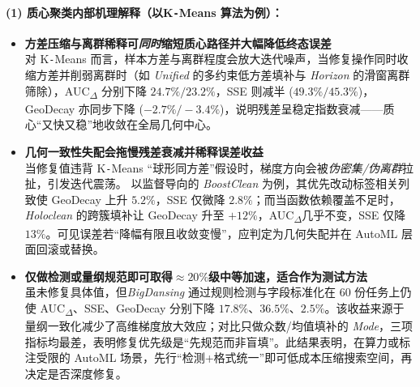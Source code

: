 \documentclass[10pt]{article} %
\numberwithin{equation}{section}
\begin{document}
\paragraph{(1) 质心聚类内部机理解释（以K\texttt{-}Means 算法为例）：}
\label{sec:centroid_by_conclusion}
\vspace{-0.25em}

\begin{itemize}[leftmargin=1.6em,itemsep=4pt]
  \item \textbf{方差压缩与离群稀释可\emph{同时}缩短质心路径并大幅降低终态误差}  \\
        对 K\texttt{-}Means 而言，样本方差与离群程度会放大迭代噪声，\textcolor[rgb]{0.00,0.07,1.00}{当修复操作同时收缩方差并削弱离群时}（如 \textit{Unified} 的多约束低方差填补与 \textit{Horizon} 的滑窗离群筛除），AUC\textsubscript{$\Delta$} 分别下降 \(24.7\%\!/\!23.2\%\)，SSE 则减半 (\(49.3\%\! / \!45.3\%\))，GeoDecay 亦同步下降 (\(-2.7\%\!/\!-3.4\%\))，\textcolor[rgb]{0.00,0.07,1.00}{说明残差呈稳定指数衰减——质心“又快又稳”地收敛在全局几何中心。}
  
  \item \textbf{几何一致性失配会拖慢残差衰减并稀释误差收益}  \\
        \textcolor[rgb]{0.00,0.07,1.00}{当修复值违背 K\texttt{-}Means “球形同方差”假设时，梯度方向会被\emph{伪密集/伪离群}拉扯，引发迭代震荡。} 以监督导向的 \textit{BoostClean} 为例，其优先改动标签相关列致使 GeoDecay 上升 \(5.2\%\)，SSE 仅微降 \(2.8\%\)；而当函数依赖覆盖不足时，\textit{Holoclean} 的跨簇填补让 GeoDecay 升至 \(+12\%\)，AUC\textsubscript{$\Delta$}几乎不变，SSE 仅降 \(13\%\)。\textcolor[rgb]{0.00,0.07,1.00}{可见误差若“降幅有限且收敛变慢”，应判定为几何失配并在 AutoML 层面回滚或替换。}
  
  \item \textbf{仅做检测或量纲规范即可取得\(\approx20\%\)级中等加速，适合作为测试方法}   \\
        虽未修复具体值，但\textit{BigDansing} 通过规则检测与字段标准化在 60 份任务上仍使 AUC\textsubscript{$\Delta$}、SSE、GeoDecay 分别下降 \(17.8\%\)、\(36.5\%\)、\(2.5\%\)。该收益来源于量纲一致化减少了高维梯度放大效应；对比只做众数/均值填补的 \textit{Mode}，三项指标均最差，表明修复优先级是“先规范而非盲填”。\textcolor[rgb]{0.00,0.07,1.00}{此结果表明，在算力或标注受限的 AutoML 场景，先行“检测+格式统一”即可低成本压缩搜索空间，再决定是否深度修复。}
\end{itemize}
\end{document}
